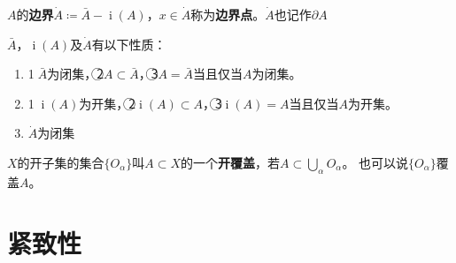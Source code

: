 \begin{definition}
	$A$的\textbf{边界}$\dot{A} \coloneq \bar{A} - \operatorname{i}(A)$，$x \in \dot{A}$称为\textbf{边界点}。$\dot{A}$也记作$\partial A$
\end{definition}

\begin{theorem}
	$\bar{A}$，$\operatorname{i}(A)$及$\dot{A}$有以下性质：
	\begin{enumerate}[（a）]
		\item \textcircled{1}$\bar{A}$为闭集，\textcircled{2}$A \subset \bar{A}$，\textcircled{3}$A = \bar{A}$当且仅当$A$为闭集。
		\item \textcircled{1}$\operatorname{i}(A)$为开集，\textcircled{2}$\operatorname{i}(A) \subset A$，\textcircled{3}$\operatorname{i}(A) = A$当且仅当$A$为开集。
		\item $\dot{A}$为闭集
	\end{enumerate}
\end{theorem}

\begin{definition}
	$X$的开子集的集合$\{O_\alpha\}$叫$A \subset X$的一个\textbf{开覆盖}，若$A \subset \bigcup\limits_\alpha O_\alpha$。
	也可以说$\{O_\alpha\}$覆盖$A$。
\end{definition}

\section{紧致性}
